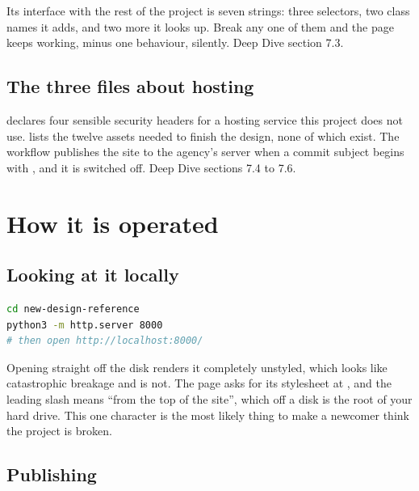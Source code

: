 \documentclass[11pt,a4paper]{article}
\begin{document}
Its interface with the rest of the project is seven strings: three selectors, two
class names it adds, and two more it looks up. Break any one of them and the page
keeps working, minus one behaviour, silently. Deep Dive section 7.3.

\subsection{The three files about hosting}

 declares four sensible security headers for a hosting service
this project does not use.  lists the twelve assets needed to
finish the design, none of which exist. The workflow publishes the site to the
agency's server when a commit subject begins with \code{[deploy]}, and it is
switched off. Deep Dive sections 7.4 to 7.6.

\section{How it is operated}

\subsection{Looking at it locally}

\begin{lstlisting}[language=bash,caption={Serve it, do not open the file directly}]
cd new-design-reference
python3 -m http.server 8000
# then open http://localhost:8000/
\end{lstlisting}

Opening  straight off the disk renders it completely unstyled,
which looks like catastrophic breakage and is not. The page asks for its
stylesheet at , and the leading slash means ``from the top of
the site'', which off a disk is the root of your hard drive. This one character is
the most likely thing to make a newcomer think the project is broken.

\subsection{Publishing}
\end{document}
